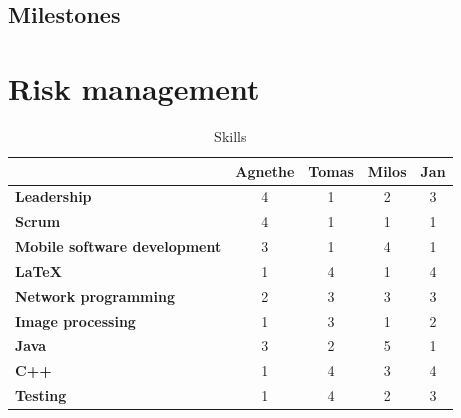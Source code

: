 \documentclass{article}
\newcommand{\ra}[1]{\renewcommand{\arraystretch}{#1}}
\begin{document}
\subsection{Milestones}
\section{Risk management}

\begin{table}\centering \ra{1.3}
    \caption{Skills}
    \label{tab:skills}
    \vspace{2mm}
    \begin{tabular}{lcccc}
    \toprule
                                & Agnethe   & Tomas & Milos & Jan \\
    \midrule
    \textbf{Leadership                 } & 4         & 1     & 2     & 3     \\ 
    \textbf{Scrum                      } & 4         & 1     & 1     & 1     \\ 
    \textbf{Mobile software development} & 3         & 1     & 4     & 1     \\ 
    \textbf{\LaTeX                     } & 1         & 4     & 1     & 4     \\ 
    \textbf{Network programming        } & 2         & 3     & 3     & 3     \\ 
    \textbf{Image processing           } & 1         & 3     & 1     & 2     \\ 
    \textbf{Java                       } & 3         & 2     & 5     & 1     \\ 
    \textbf{C++                        } & 1         & 4     & 3     & 4     \\ 
    \textbf{Testing                    } & 1         & 4     & 2     & 3     \\
    \bottomrule
    \end{tabular}
\end{table}
\end{document}
